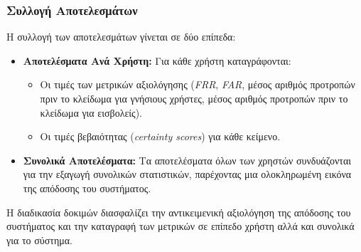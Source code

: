 \subsubsection{Συλλογή Αποτελεσμάτων}
Η συλλογή των αποτελεσμάτων γίνεται σε δύο επίπεδα:
\begin{itemize}
    \item \textbf{Αποτελέσματα Ανά Χρήστη:} Για κάθε χρήστη καταγράφονται:
    \begin{itemize}
        \item Οι τιμές των μετρικών αξιολόγησης (\emph{FRR}, \emph{FAR}, μέσος αριθμός προτροπών πριν το κλείδωμα για γνήσιους χρήστες, μέσος αριθμός προτροπών πριν το κλείδωμα για εισβολείς).
        \item Οι τιμές βεβαιότητας (\emph{certainty scores}) για κάθε κείμενο.
    \end{itemize}
    \item \textbf{Συνολικά Αποτελέσματα:} Τα αποτελέσματα όλων των χρηστών συνδυάζονται για την εξαγωγή συνολικών στατιστικών, παρέχοντας μια ολοκληρωμένη εικόνα της απόδοσης του συστήματος.
\end{itemize}

Η διαδικασία δοκιμών διασφαλίζει την αντικειμενική αξιολόγηση της απόδοσης του συστήματος και την καταγραφή των μετρικών σε επίπεδο χρήστη αλλά και συνολικά για το σύστημα.